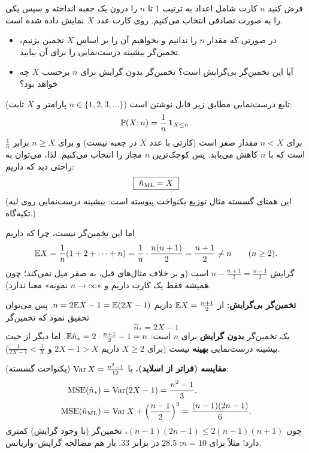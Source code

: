 \begin{example}
فرض کنید $n$ کارت شامل اعداد به ترتیب $1$ تا $n$ را درون یک جعبه انداخته و سپس یکی را به صورت تصادفی انتخاب می‌کنیم. روی کارت عدد $X$ نمایش داده شده است.
\begin{itemize}
\item در صورتی که مقدار $n$ را ندانیم و بخواهیم آن را بر اساس $X$ تخمین بزنیم، تخمین‌گر بیشینه درست‌نمایی را برای آن بیابید.
\item آیا این تخمین‌گر بی‌گرایش  است؟ تخمین‌گر بدون گرایش برای $n$ برحسب $X$ چه خواهد بود؟
\end{itemize}
\begin{solution}
تابع درست‌نمایی  مطابق زیر قابل نوشتن است ($n\in\{1,2,3,\ldots\}$ پارامتر و $X$ ثابت):
\[
\mathbb{P}(X;n)=\frac1n\,\mathbf{1}_{X\le n}.
\]
برای $n<X$ مقدار صفر است (کارتی با عدد $X$ در جعبه نیست) و برای $n\ge X$ برابر $\frac1n$ است که با $n$ کاهش می‌یابد. پس کوچک‌ترین $n$ مجاز را انتخاب می‌کنیم. لذا، می‌توان به راحتی دید که داریم:
\[
\boxed{\ \hat n_{\mathrm{ML}}=X\ }
\]
(این همتای گسسته مثال توزیع یکنواخت پیوسته است: بیشینه درست‌نمایی روی لبه تکیه‌گاه.)

اما این تخمین‌گر  نیست، چرا که داریم
\[
\mathbb{E} X=\frac1n(1+2+\cdots+n)=\frac1n\cdot\frac{n(n+1)}{2}=\frac{n+1}{2}\ne n\qquad(n\ge2).
\]
گرایش $n-\frac{n+1}2=\frac{n-1}2$ است (و بر خلاف مثال‌های قبل، به صفر میل نمی‌کند؛ چون همیشه فقط یک کارت داریم و «$n\to\infty$ نمونه» معنا ندارد).

\textbf{تخمین‌گر بی‌گرایش:} از $\mathbb{E} X=\frac{n+1}{2}$ داریم $n=2\mathbb{E} X-1=\mathbb{E}(2X-1)$. پس می‌توان تحقیق نمود که تخمین‌گر
\[
\boxed{\ \hat n_*=2X-1\ }
\]
یک تخمین‌گر \textbf{بدون گرایش} برای $n$ است: $\mathbb{E}\hat n_*=2\cdot\frac{n+1}{2}-1=n$. اما دیگر از حیث بیشینه درست‌نمایی \textbf{بهینه} نیست (برای $X\ge2$ داریم $2X-1>X$ و $\frac{1}{2X-1}<\frac1X$).

\textbf{مقایسه  (فراتر از اسلاید).} با $\operatorname{Var} X=\frac{n^2-1}{12}$ (یکنواخت گسسته):
\[
\begin{aligned}
\mathrm{MSE}(\hat n_*)&=\operatorname{Var}(2X-1)=\frac{n^2-1}{3},\\
\mathrm{MSE}(\hat n_{\mathrm{ML}})&=\operatorname{Var} X+\Big(\frac{n-1}2\Big)^2=\frac{(n-1)(2n-1)}{6}.
\end{aligned}
\]
چون $(n-1)(2n-1)\le2(n-1)(n+1)$، تخمین‌گر  (با وجود گرایش)  کمتری دارد! مثلاً برای $n=10$: $28.5$ در برابر $33$. باز هم مصالحه گرایش--واریانس.
\end{solution}
\end{example}

